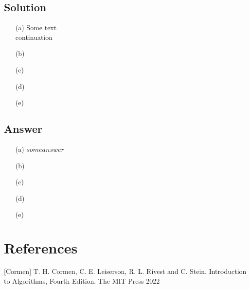 \documentclass{article}
\begin{document}
\subsection{Solution}
\begin{itemize}
    \setlength\itemsep{0em}
    \item [(a)] Some text \\
    continuation
    \item [(b)] 
    \item [(c)] 
    \item [(d)] 
    \item [(e)] 
\end{itemize}

\subsection{Answer}
\begin{itemize}
    \setlength\itemsep{0em}
    \item [(a)] $some answer$
    \item [(b)] 
    \item [(c)] 
    \item [(d)] 
    \item [(e)] 
\end{itemize}

\section*{References}
[Cormen] T. H. Cormen, C. E. Leiserson, R. L. Rivest and C. Stein. Introduction to Algorithms, Fourth Edition. The MIT Press 2022
\end{document}
